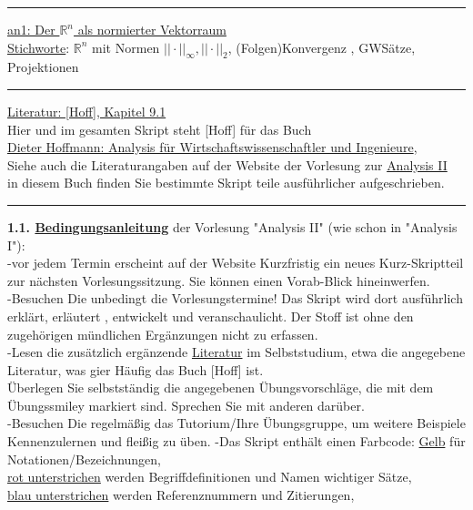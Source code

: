 \documentclass[11pt]{article}
\newcommand{\redcircle}[1]{%
	\tikz[baseline=(char.base)]{
		\node[shape=circle, draw=red, text=red, thick, inner sep=1pt] (char) {\textbf{#1}};
	}%
}
\begin{document}
	
	\Large
	
	
	
	
	
	\medskip\hrule\medskip
	\underline{an1: Der $\mathbb{R}^n$ als normierter Vektorraum}\\
	\underline{Stichworte}: $\mathbb{R}^n$ mit Normen $||\cdot||_{\infty}, ||\cdot||_2$, (Folgen)Konvergenz , GWSätze, Projektionen\\
	\medskip\hrule\medskip
	\underline{Literatur: [Hoff], Kapitel 9.1}\\
	Hier und im gesamten Skript steht [Hoff] für das Buch\\
	\underline{Dieter Hoffmann: Analysis für Wirtschaftswissenschaftler und Ingenieure},\\
	Siehe auch die Literaturangaben auf der Website der Vorlesung zur \href{https://www.math.uni-duesseldorf.de/~internet/Ana2_SoSe25/#veranstaltungen}{Analysis II}\\
	in diesem Buch finden Sie bestimmte Skript teile ausführlicher aufgeschrieben.\\
	\medskip\hrule\medskip
	\textbf{1.1. \underline{Bedingungsanleitung}} der Vorlesung "Analysis II" 
	(wie schon in "Analysis I"):\\
	-vor jedem Termin erscheint auf der Website Kurzfristig ein neues 
	Kurz-Skriptteil zur nächsten Vorlesungssitzung. Sie können einen 
	Vorab-Blick hineinwerfen.\\
	-Besuchen Die unbedingt die Vorlesungstermine! Das Skript wird dort ausführlich erklärt, erläutert , entwickelt und veranschaulicht. Der Stoff ist ohne den zugehörigen mündlichen Ergänzungen nicht zu erfassen.\\
	-Lesen die zusätzlich ergänzende \underline{Literatur} im Selbststudium, 
	etwa die angegebene Literatur, was gier Häufig das Buch [Hoff] ist.\\
	Überlegen Sie selbstständig die angegebenen Übungsvorschläge, die mit dem Übungssmiley \redcircle{Ü} markiert sind. Sprechen Sie mit anderen darüber.\\
	-Besuchen Die regelmäßig das Tutorium/Ihre Übungsgruppe, um weitere 
	Beispiele Kennenzulernen und fleißig zu üben.
	-Das Skript enthält einen Farbcode: \ul{Gelb} für Notationen/Bezeichnungen,\\
	\ul{rot unterstrichen} werden Begriffdefinitionen und Namen wichtiger Sätze,\\
	\ul{blau unterstrichen} werden Referenznummern und Zitierungen,\\
\end{document}
